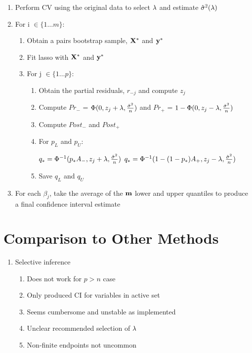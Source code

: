 \begin{enumerate}
\item Perform CV using the original data to select $\lambda$ and estimate $\hat{\sigma}^2(\lambda)$
\item For i $\in \lbrace 1 \ldots m \rbrace$:
\begin{enumerate}
\item Obtain a pairs bootstrap sample, $\mathbf{X}^*$ and $\mathbf{y}^*$
\item Fit lasso with $\mathbf{X}^*$ and $\mathbf{y}^*$
\item For j $\in \lbrace 1 \ldots p \rbrace$:
	\begin{enumerate}
	\item Obtain the partial residuals, $r_{-j}$ and compute $z_j$
	\item Compute $Pr_{-}$ = $\Phi(0, z_j + \lambda, \frac{\hat{\sigma}^2}{n})$ and $Pr_{+}$ = $1 - \Phi(0, z_j - \lambda, \frac{\hat{\sigma}^2}{n})$
	\item Compute $Post_-$ and $Post_+$
	\item For $p_L$ and $p_U$:
	\begin{algorithmic}
			\State $q_* = \Phi^{-1}(p_* A_{-}, z_j + \lambda, \frac{\hat{\sigma}^2}{n})$
		\Else
			\State $q_* = \Phi^{-1}(1 - (1 - p_*)A_{+}, z_j - \lambda, \frac{\hat{\sigma}^2}{n})$
		\EndIf
	\end{algorithmic}
	\item Save $q_L$ and $q_U$
	\end{enumerate}
\end{enumerate}
\item For each $\beta_j$, take the average of the $\mathbf{m}$ lower and upper quantiles to produce a final confidence interval estimate
\end{enumerate}

\section{Comparison to Other Methods}

\begin{enumerate}
\item Selective inference
\begin{enumerate}
\item Does not work for $p > n$ case
\item Only produced CI for variables in active set
\item Seems cumbersome and unstable as implemented
\item Unclear recommended selection of $\lambda$
\item Non-finite endpoints not uncommon
\end{enumerate}
\end{enumerate}

